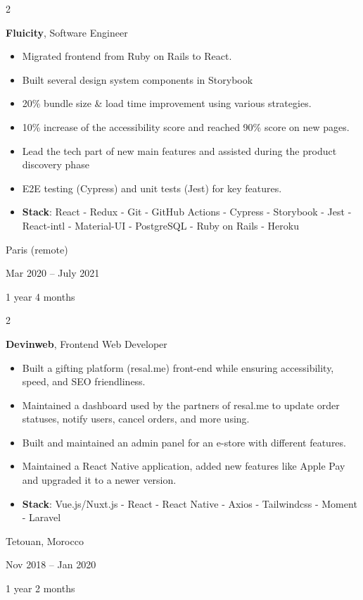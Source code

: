 \documentclass[10pt, letterpaper]{article}
\newenvironment{highlights}{
    \begin{itemize}[
        topsep=0.10 cm,
        parsep=0.10 cm,
        partopsep=0pt,
        itemsep=0pt,
        leftmargin=0.4 cm + 10pt
    ]
}{
    \end{itemize}
} %
\newenvironment{twocolentry}[2][]{
    \onecolentry
    \def\secondColumn{#2}
    \setcolumnwidth{\fill, 4.5 cm}
    \begin{paracol}{2}
}{
    \switchcolumn \raggedleft \secondColumn
    \end{paracol}
    \endonecolentry
} %
\begin{document}
        \begin{twocolentry}{
            Paris (remote)

        Mar 2020 – July 2021

        1 year 4 months
        }
            \textbf{Fluicity}, Software Engineer
            \begin{highlights}
                \item Migrated frontend from Ruby on Rails to React.
                \item Built several design system components in Storybook
                \item 20\% bundle size \& load time improvement using various strategies.
                \item 10\% increase of the accessibility score and reached 90\% score on new pages.
                \item Lead the tech part of new main features and assisted during the product discovery phase
                \item E2E testing (Cypress) and unit tests (Jest) for key features.
                \item \textbf{Stack}: React - Redux - Git - GitHub Actions - Cypress - Storybook - Jest - React-intl - Material-UI - PostgreSQL - Ruby on Rails - Heroku
            \end{highlights}
        \end{twocolentry}


        \vspace{0.2 cm}

        \begin{twocolentry}{
            Tetouan, Morocco

        Nov 2018 – Jan 2020

        1 year 2 months
        }
            \textbf{Devinweb}, Frontend Web Developer
            \begin{highlights}
                \item Built a gifting platform (resal.me) front-end while ensuring accessibility, speed, and SEO friendliness.
                \item Maintained a dashboard used by the partners of resal.me to update order statuses, notify users, cancel orders, and more using.
                \item Built and maintained an admin panel for an e-store with different features.
                \item Maintained a React Native application, added new features like Apple Pay and upgraded it to a newer version.
                \item \textbf{Stack}: Vue.js/Nuxt.js - React - React Native - Axios - Tailwindcss - Moment - Laravel
            \end{highlights}
        \end{twocolentry}
\end{document}
